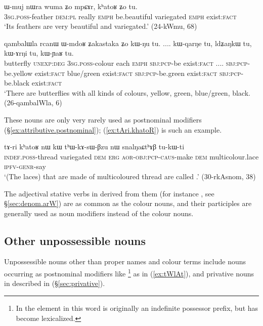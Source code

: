 \begin{exe}
\ex \label{ex:khatoR.Zo.tu}
 \gll ɯ-muj nɯra wuma ʑo mpɕɤr, kʰatoʁ ʑo tu. \\
 \textsc{3sg}.\textsc{poss}-feather \textsc{dem}:\textsc{pl} really \textsc{emph} be.beautiful variegated \textsc{emph} exist:\textsc{fact} \\
 \glt `Its feathers are very beautiful and variegated.' (24-kWmu, 68)
\end{exe}


\begin{exe}
\ex \label{ex:ldZaNkW}
 \gll qambalɯla rcanɯ ɯ-mdoʁ ʑakastaka ʑo kɯ-ŋu tu. .... kɯ-qarŋe tu, ldʑaŋkɯ tu, kɯ-ɤrŋi tu, kɯ-ɲaʁ tu. \\
 butterfly \textsc{unexp}:\textsc{deg} \textsc{3sg}.\textsc{poss}-colour each \textsc{emph} \textsc{sbj}:\textsc{pcp}-be exist:\textsc{fact} .... \textsc{sbj}:\textsc{pcp}-be.yellow exist:\textsc{fact} blue/green exist:\textsc{fact}  \textsc{sbj}:\textsc{pcp}-be.green exist:\textsc{fact} \textsc{sbj}:\textsc{pcp}-be.black exist:\textsc{fact}\\
 \glt `There are butterflies with all kinds of colours, yellow, green, blue/green, black. (26-qambalWla, 6)
\end{exe}

These nouns are only very rarely used as postnominal modifiers (§\ref{ex:attributive.postnominal}); (\ref{ex:tAri.khatoR}) is such an example.

\begin{exe}
\ex \label{ex:tAri.khatoR}
 \gll tɤ-ri kʰatoʁ nɯ kɯ tʰɯ-kɤ-sɯ-βzu nɯ snalŋaɕtʰɤβ tu-kɯ-ti \\
 \textsc{indef}.\textsc{poss}-thread variegated \textsc{dem} \textsc{erg} \textsc{aor}-\textsc{obj}:\textsc{pcp}-\textsc{caus}-make \textsc{dem} multicolour.lace \textsc{ipfv}-\textsc{genr}-say \\
 \glt `(The laces) that are made of multicoloured thread are called .' (30-rkAsnom, 38)
\end{exe}

The adjectival stative verbs in  derived from them (for instance , see §\ref{sec:denom.arW}) are as common as the colour nouns, and their participles are generally used as noun modifiers instead of the colour nouns.


\subsection{Other unpossessible nouns}   \label{sec:other.upn}
Unpossessible nouns other than proper names and colour terms include nouns occurring as postnominal modifiers like \footnote{In  the  element in this word is originally an indefinite possessor prefix, but has become lexicalized.} as in (\ref{ex:tWlAt}), and privative nouns in  described in (§\ref{sec:privative}).

